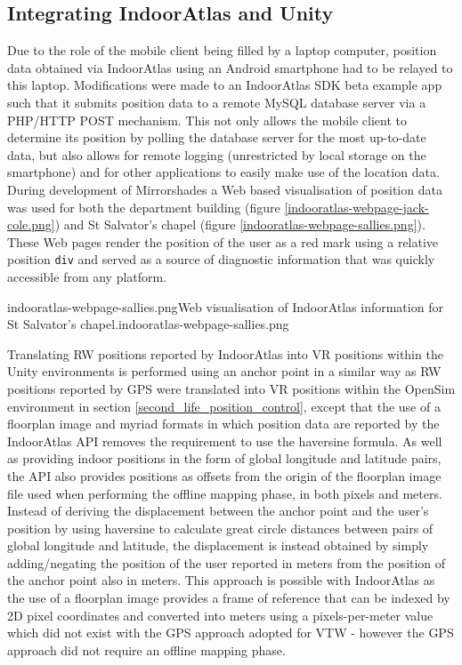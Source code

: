 
\subsection{Integrating IndoorAtlas and Unity}

Due to the role of the mobile client being filled by a laptop computer, position data obtained via IndoorAtlas using an Android smartphone had to be relayed to this laptop. Modifications were made to an IndoorAtlas SDK beta example app such that it submits position data to a remote MySQL database server via a PHP/HTTP POST mechanism. This not only allows the mobile client to determine its position by polling the database server for the most up-to-date data, but also allows for remote logging (unrestricted by local storage on the smartphone) and for other applications to easily make use of the location data. During development of Mirrorshades a Web based visualisation of position data was used for both the department building (figure \ref{indooratlas-webpage-jack-cole.png}) and St Salvator's chapel (figure \ref{indooratlas-webpage-sallies.png}). These Web pages render the position of the user as a red mark using a relative position \texttt{div} and served as a source of diagnostic information that was quickly accessible from any platform.

        {indooratlas-webpage-sallies.png}{Web visualisation of IndoorAtlas information for St Salvator's chapel.}{indooratlas-webpage-sallies.png}

Translating RW positions reported by IndoorAtlas into VR positions within the Unity environments is performed using an anchor point in a similar way as RW positions reported by GPS were translated into VR positions within the OpenSim environment in section \ref{second_life_position_control}, except that the use of a floorplan image and myriad formats in which position data are reported by the IndoorAtlas API removes the requirement to use the haversine formula. As well as providing indoor positions in the form of global longitude and latitude pairs, the API also provides positions as offsets from the origin of the floorplan image file used when performing the offline mapping phase, in both pixels and meters. Instead of deriving the displacement between the anchor point and the user's position by using haversine to calculate great circle distances between pairs of global longitude and latitude, the displacement is instead obtained by simply adding/negating the position of the user reported in meters from the position of the anchor point also in meters. This approach is possible with IndoorAtlas as the use of a floorplan image provides a frame of reference that can be indexed by 2D pixel coordinates and converted into meters using a pixels-per-meter value which did not exist with the GPS approach adopted for VTW - however the GPS approach did not require an offline mapping phase.

